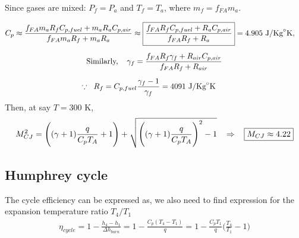 \documentclass[a4paper,10pt]{article}
\begin{document}
Since gases are mixed: $P_f = P_a$ and $T_f = T_a$, where $m_f = f_{FA}m_a$.

\vspace*{-0.5cm}
\begin{gather*}
    C_p\approx\frac{f_{FA}m_aR_fC_{p,fuel}+m_aR_aC_{p,air}}{f_{FA}m_aR_f+m_aR_a}\approx\boxed{\frac{f_{FA}R_fC_{p,fuel}+R_aC_{p,air}}{f_{FA}R_f+R_a}} = 4.905\text{ J/Kg}^{\circ}\text{K},\hspace*{0.4cm}\\[0.2cm]
    \text{Similarly,}\hspace*{0.4cm}\gamma_f = \frac{f_{FA}R_f\gamma_f+R_{air}C_{p,air}}{f_{FA}R_f+R_{air}}\\[0.2cm]
    \because\hspace*{0.2cm}R_f = C_{p,fuel}\frac{\gamma_f-1}{\gamma_f} = 4091\text{ J/Kg}^{\circ}\text{K}\hspace*{0.5cm}
\end{gather*}
Then, at say $T = 300$ K,
\begin{gather*}
    M_{CJ}^2 = \Bigg((\gamma+1)\frac{q}{C_pT_A}+1\Bigg)+\sqrt{\Bigg((\gamma+1)\frac{q}{C_pT_A}\Bigg)^2-1}\hspace*{0.3cm}\Rightarrow\hspace*{0.3cm}\boxed{M_{CJ} \approx4.22}
\end{gather*}

\subsection{Humphrey cycle}
The cycle efficiency can be expressed as, we also need to find expression for the expansion temperature ratio $T_4/T_1$
\begin{gather*}
    \eta_{cycle} = 1-\frac{h_4-h_1}{\Delta h_{burn}}=1-\frac{C_p(T_4-T_1)}{q} = 1-\frac{C_pT_1}{q}\Bigg(\frac{T_4}{T_1}-1\Bigg)
\end{gather*}
\end{document}
